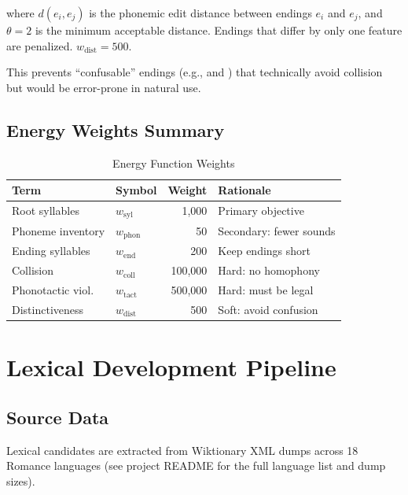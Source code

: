 \documentclass[12pt]{book}
\begin{document}
where $d(e_i, e_j)$ is the phonemic edit distance between endings $e_i$ and $e_j$,
and $\theta = 2$ is the minimum acceptable distance. Endings that differ by
only one feature are penalized. $w_{\text{dist}} = 500$.

This prevents ``confusable'' endings (e.g.,  and )
that technically avoid collision but would be error-prone in natural use.


\section{Energy Weights Summary}

\begin{table}[h]
\centering
\caption{Energy Function Weights}
\label{tab:weights}
\begin{tabular}{@{}llrl@{}}
\toprule
Term              & Symbol             & Weight & Rationale \\
\midrule
Root syllables    & $w_{\text{syl}}$   & 1,000  & Primary objective \\
Phoneme inventory & $w_{\text{phon}}$  & 50     & Secondary: fewer sounds \\
Ending syllables  & $w_{\text{end}}$   & 200    & Keep endings short \\
Collision         & $w_{\text{coll}}$  & 100,000 & Hard: no homophony \\
Phonotactic viol. & $w_{\text{tact}}$  & 500,000 & Hard: must be legal \\
Distinctiveness   & $w_{\text{dist}}$  & 500    & Soft: avoid confusion \\
\bottomrule
\end{tabular}
\end{table}


\chapter{Lexical Development Pipeline}
\label{ch:lexicon}

\section{Source Data}

Lexical candidates are extracted from Wiktionary XML dumps across 18 Romance
languages (see project README for the full language list and dump sizes).
\end{document}
